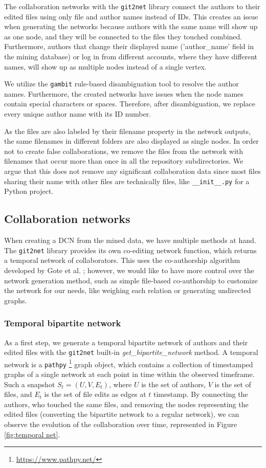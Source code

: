 The collaboration networks with the \texttt{git2net} library connect the authors to their edited files using only file and author names instead of IDs. This creates an issue when generating the networks because authors with the same name will show up as one node, and they will be connected to the files they touched combined. Furthermore, authors that change their displayed name ('author\_name' field in the mining database) or log in from different accounts, where they have different names, will show up as multiple nodes instead of a single vertex.

We utilize the \texttt{gambit} \cite{goteGambitOpenSource2021} rule-based disambiguation tool to resolve the author names. Furthermore, the created networks have issues when the node names contain special characters or spaces. Therefore, after disambiguation, we replace every unique author name with its ID number.

As the files are also labeled by their filename property in the network outputs, the same filenames in different folders are also displayed as single nodes. In order not to create false collaborations, we remove the files from the network with filenames that occur more than once in all the repository subdirectories. We argue that this does not remove any significant collaboration data since most files sharing their name with other files are technically files, like \texttt{\_\_init\_\_.py} for a Python project.

\subsection{Collaboration networks}

When creating a DCN from the mined data, we have multiple methods at hand. The \texttt{git2net} library provides its own co-editing network function, which returns a temporal network of collaborators. This uses the co-authorship algorithm developed by Gote et al. \cite{goteAnalysingTimeStampedCoEditing2019}; however, we would like to have more control over the network generation method, such as simple file-based co-authorship to customize the network for our needs, like weighing each relation or generating undirected graphs.

\subsubsection{Temporal bipartite network}
As a first step, we generate a temporal bipartite network of authors and their edited files with the \texttt{git2net} built-in \textit{get\_bipartite\_network} method. A temporal network is a \texttt{pathpy} \footnote{\url{https://www.pathpy.net/}} graph object, which contains a collection of timestamped graphs of a single network at each point in time within the observed timeframe. Such a snapshot $S_t = (U, V, E_t)$, where $U$ is the set of authors, $V$ is the set of files, and $E_t$ is the set of file edits as edges at $t$ timestamp. By connecting the authors, who touched the same files, and removing the nodes representing the edited files (converting the bipartite network to a regular network), we can observe the evolution of the collaboration over time, represented in Figure \ref{fig:temporal net}.

